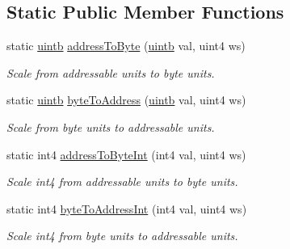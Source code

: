 \subsection*{Static Public Member Functions}
\begin{DoxyCompactItemize}
\item 
static \mbox{\hyperlink{types_8h_a2db313c5d32a12b01d26ac9b3bca178f}{uintb}} \mbox{\hyperlink{class_addr_space_af5925a4ae67a290f59bf17533fac62b4}{address\+To\+Byte}} (\mbox{\hyperlink{types_8h_a2db313c5d32a12b01d26ac9b3bca178f}{uintb}} val, uint4 ws)
\begin{DoxyCompactList}\small\item\em Scale from addressable units to byte units. \end{DoxyCompactList}\item 
static \mbox{\hyperlink{types_8h_a2db313c5d32a12b01d26ac9b3bca178f}{uintb}} \mbox{\hyperlink{class_addr_space_a3c9149df492bdcaccc208eac261e8365}{byte\+To\+Address}} (\mbox{\hyperlink{types_8h_a2db313c5d32a12b01d26ac9b3bca178f}{uintb}} val, uint4 ws)
\begin{DoxyCompactList}\small\item\em Scale from byte units to addressable units. \end{DoxyCompactList}\item 
static int4 \mbox{\hyperlink{class_addr_space_a18aa860242e1e753b3ad786a0aa1b36e}{address\+To\+Byte\+Int}} (int4 val, uint4 ws)
\begin{DoxyCompactList}\small\item\em Scale int4 from addressable units to byte units. \end{DoxyCompactList}\item 
static int4 \mbox{\hyperlink{class_addr_space_a082aa8e67257bcdcfc40d1280a3d0315}{byte\+To\+Address\+Int}} (int4 val, uint4 ws)
\begin{DoxyCompactList}\small\item\em Scale int4 from byte units to addressable units. \end{DoxyCompactList}\end{DoxyCompactItemize}
